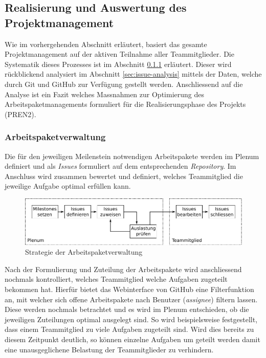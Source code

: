 \subsection{Realisierung und Auswertung des Projektmanagement}
Wie im vorhergehenden Abschnitt erläutert, basiert das gesamte
Projektmanagement auf der aktiven Teilnahme aller Teammitglieder.
Die Systematik dieses Prozesses ist im Abschnitt 
\ref{sec:issue-management} erläutert. Dieser wird rückblickend
analysiert im Abschnitt \ref{sec:issue-analysis} mittels der Daten,
welche durch Git und GitHub zur Verfügung gestellt werden.
Anschliessend auf die Analyse ist ein Fazit welches Massnahmen zur
Optimierung des Arbeitspaketmanagements formuliert für die
Realisierungsphase des Projekts (PREN2).

\subsubsection{Arbeitspaketverwaltung}
\label{sec:issue-management}
Die für den jeweiligen Meilenstein notwendigen Arbeitspakete werden im
Plenum definiert und als \emph{Issues} formuliert auf dem entsprechenden
\emph{Repository}. Im Anschluss wird zusammen bewertet und definiert,
welches Teammitglied die jeweilige Aufgabe optimal erfüllen kann.

\begin{figure}[h!]
	\centering
	\includegraphics[scale=1]{../../fig/pm/issue_01.pdf}
	\caption{Strategie der Arbeitspaketverwaltung}
	\label{fig:pm-issue-01}
\end{figure}

Nach der Formulierung und Zuteilung der Arbeitspakete wird anschliessend
nochmals kontrolliert, welches Teammitglied welche Aufgaben zugeteilt
bekommen hat. Hierfür bietet das Webinterface von GitHub eine
Filterfunktion an, mit welcher sich offene Arbeitspakete nach Benutzer
(\emph{assignee}) filtern lassen. Diese werden nochmals betrachtet und
es wird im Plenum entschieden, ob die jeweiligen Zuteilungen optimal
ausgelegt sind. So wird beispielsweise festgestellt, dass einem
Teammitglied zu viele Aufgaben zugeteilt sind. Wird dies bereits zu
diesem Zeitpunkt deutlich, so können einzelne Aufgaben um geteilt werden
damit eine unausgeglichene Belastung der Teammitglieder zu verhindern.

